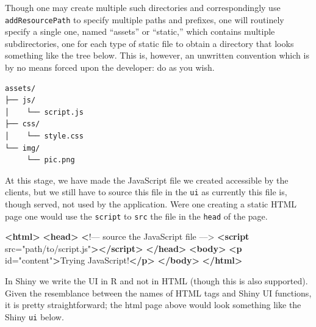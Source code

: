 \documentclass[10pt,]{krantz}
\makeatletter
\newenvironment{Shaded}{\begin{snugshade}}{\end{snugshade}}
\newcommand{\DataTypeTok}[1]{\textcolor[rgb]{0.27,0.27,0.27}{#1}}
\newcommand{\ErrorTok}[1]{\textcolor[rgb]{0.14,0.14,0.14}{\textbf{#1}}}
\newcommand{\KeywordTok}[1]{\textcolor[rgb]{0.27,0.27,0.27}{\textbf{#1}}}
\newcommand{\NormalTok}[1]{#1}
\newcommand{\OperatorTok}[1]{\textcolor[rgb]{0.43,0.43,0.43}{\textbf{#1}}}
\newcommand{\OtherTok}[1]{\textcolor[rgb]{0.37,0.37,0.37}{#1}}
\newcommand{\StringTok}[1]{\textcolor[rgb]{0.5,0.5,0.5}{#1}}
\newenvironment{kframe}{%
\medskip{}
\setlength{\fboxsep}{.8em}
 \def\at@end@of@kframe{}%
 \ifinner\ifhmode%
  \def\at@end@of@kframe{\end{minipage}}%
  \begin{minipage}{\columnwidth}%
 \fi\fi%
 \def\FrameCommand##1{\hskip\@totalleftmargin \hskip-\fboxsep
 \colorbox{shadecolor}{##1}\hskip-\fboxsep
     \hskip-\linewidth \hskip-\@totalleftmargin \hskip\columnwidth}%
 \MakeFramed {\advance\hsize-\width
   \@totalleftmargin\z@ \linewidth\hsize
   \@setminipage}}%
 {\par\unskip\endMakeFramed%
 \at@end@of@kframe}
\renewenvironment{Shaded}{\begin{kframe}}{\end{kframe}}
\makeatother
\begin{document}
Though one may create multiple such directories and correspondingly use \texttt{addResourcePath} to specify multiple paths and prefixes, one will routinely specify a single one, named ``assets'' or ``static,'' which contains multiple subdirectories, one for each type of static file to obtain a directory that looks something like the tree below. This is, however, an unwritten convention which is by no means forced upon the developer: do as you wish.

\begin{verbatim}
assets/
├── js/
│    └── script.js
├── css/
│    └── style.css
└── img/
     └── pic.png
\end{verbatim}

At this stage, we have made the JavaScript file we created accessible by the clients, but we still have to source this file in the \texttt{ui} as currently this file is, though served, not used by the application. Were one creating a static HTML page one would use the \texttt{script} to \texttt{src} the file in the \texttt{head} of the page.

\begin{Shaded}
\begin{Highlighting}[]
\KeywordTok{<html>}
  \KeywordTok{<head>}
    \ErrorTok{<}\NormalTok{!–– source the JavaScript file ––>}
    \KeywordTok{<script}\OtherTok{ src=}\StringTok{"path/to/script.js"}\KeywordTok{></script>}
  \KeywordTok{</head>}
  \KeywordTok{<body>}
    \KeywordTok{<p}\OtherTok{ id=}\StringTok{"content"}\KeywordTok{>}\NormalTok{Trying JavaScript!}\KeywordTok{</p>}
  \KeywordTok{</body>}
\KeywordTok{</html>}
\end{Highlighting}
\end{Shaded}

In Shiny we write the UI in R and not in HTML (though this is also supported). Given the resemblance between the names of HTML tags and Shiny UI functions, it is pretty straightforward; the html page above would look something like the Shiny \texttt{ui} below.

\begin{Shaded}
\end{Shaded}
\end{document}
